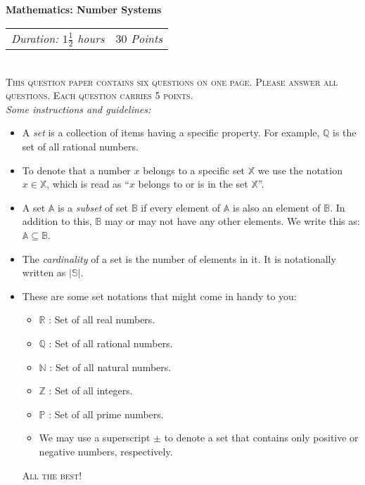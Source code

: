 \documentclass[8pt]{extarticle}
\begin{document}
\begin{center}
\large{\textbf{Mathematics: Number Systems}}
\end{center}


\begin{tabular}{p{8cm}r}
\textit{Duration: $1\frac{1}{2}$ hours} & \textit{$30$ Points}
\end{tabular}\\

\textsc{ This question paper contains six questions on one page. Please answer all questions. Each question carries 5 points.}\\

\textit{Some instructions and guidelines:\\}
\begin{itemize}
\item A \textit{set} is a collection of items having a specific property. For example, $\mathbb{Q}$ is the set of all rational numbers. 
\item To denote that a number $x$ belongs to a specific set $\mathbb{X}$ we use the notation $x \in \mathbb{X}$, which is read as ``$x$ belongs to or is in the set $\mathbb{X}$''.
\item A set $\mathbb{A}$ is a \textit{subset} of set $\mathbb{B}$ if every element of $\mathbb{A}$ is also an element of $\mathbb{B}$. In addition to this, $\mathbb{B}$  may or may not have any other elements. We write this as: $\mathbb{A} \subseteq \mathbb{B}$.
\item The \textit{cardinality} of a set is the number of elements in it. It is notationally written as $\left\vert{\mathbb{S}}\right\vert$.
\item These are some set notations that might come in handy to you:
\begin{itemize}
\item $\mathbb{R}$ : Set of all real numbers.
\item $\mathbb{Q}$ : Set of all rational numbers.
\item $\mathbb{N}$ : Set of all natural numbers.
\item $\mathbb{Z}$ : Set of all integers.
\item $\mathbb{P}$ : Set of all prime numbers.
\item We may use a superscript $\pm$ to denote a set that contains only positive or negative numbers, respectively.
\end{itemize}
\begin{center}
\textsc{All the best!}
\end{center}
\end{itemize}
\end{document}
